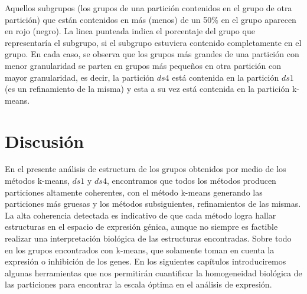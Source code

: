 Aquellos subgrupos (los grupos de una partición contenidos en el grupo de otra partición) que están contenidos en más (menos) de un 50\% en el grupo aparecen en rojo (negro). La linea punteada indica el porcentaje del grupo que representaría el subgrupo, si el subgrupo estuviera contenido completamente en el grupo.
En cada caso, se observa que los grupos más grandes de una partición con menor granularidad se parten en grupos más pequeños en otra partición con mayor granularidad, es decir, la partición $ds4$ está contenida en la partición $ds1$ (es un refinamiento de la misma) y esta a su vez está contenida en la partición k-means.\\
\section{Discusión}
En el presente análisis de estructura de los grupos obtenidos por medio de los métodos k-means, $ds1$ y $ds4$, encontramos que todos los métodos producen particiones altamente coherentes, con el método k-means generando las particiones más gruesas y los métodos subsiguientes, refinamientos de las mismas. La alta coherencia detectada es indicativo de que cada método logra  hallar estructuras en el espacio de expresión génica, aunque no siempre es factible realizar una interpretación biológica de las estructuras encontradas. Sobre todo en los grupos encontrados con k-means, que solamente toman en cuenta la expresión o inhibición de los genes. En los siguientes capítulos introduciremos algunas herramientas que nos permitirán cuantificar la homogeneidad biológica de las particiones para encontrar la escala óptima en el análisis de expresión.